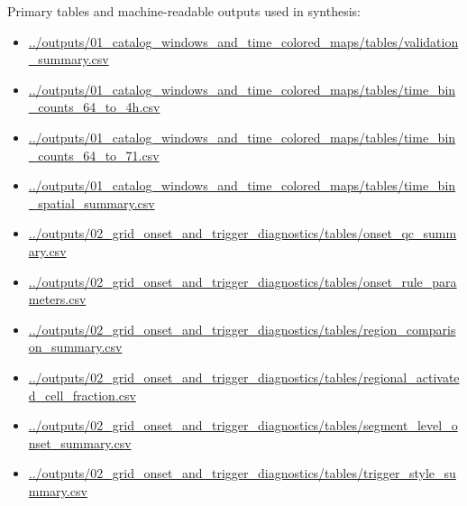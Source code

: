 \documentclass[11pt]{article}
\begin{document}
Primary tables and machine-readable outputs used in synthesis:
\begin{itemize}[leftmargin=1.5em]
    \item \url{../outputs/01_catalog_windows_and_time_colored_maps/tables/validation_summary.csv}
    \item \url{../outputs/01_catalog_windows_and_time_colored_maps/tables/time_bin_counts_64_to_4h.csv}
    \item \url{../outputs/01_catalog_windows_and_time_colored_maps/tables/time_bin_counts_64_to_71.csv}
    \item \url{../outputs/01_catalog_windows_and_time_colored_maps/tables/time_bin_spatial_summary.csv}
    \item \url{../outputs/02_grid_onset_and_trigger_diagnostics/tables/onset_qc_summary.csv}
    \item \url{../outputs/02_grid_onset_and_trigger_diagnostics/tables/onset_rule_parameters.csv}
    \item \url{../outputs/02_grid_onset_and_trigger_diagnostics/tables/region_comparison_summary.csv}
    \item \url{../outputs/02_grid_onset_and_trigger_diagnostics/tables/regional_activated_cell_fraction.csv}
    \item \url{../outputs/02_grid_onset_and_trigger_diagnostics/tables/segment_level_onset_summary.csv}
    \item \url{../outputs/02_grid_onset_and_trigger_diagnostics/tables/trigger_style_summary.csv}
\end{itemize}
\end{document}
